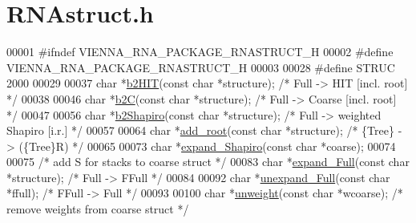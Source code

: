 \hypertarget{RNAstruct_8h_source}{}\section{R\+N\+Astruct.\+h}
\label{RNAstruct_8h_source}

\begin{DoxyCode}
00001 \textcolor{preprocessor}{#ifndef VIENNA\_RNA\_PACKAGE\_RNASTRUCT\_H}
00002 \textcolor{preprocessor}{#define VIENNA\_RNA\_PACKAGE\_RNASTRUCT\_H}
00003 
00028 \textcolor{preprocessor}{#define STRUC     2000}
00029 
00037 \textcolor{keywordtype}{char} *\hyperlink{group__struct__utils_ga07b7e90e712559a1992fba3ac6d21bbd}{b2HIT}(\textcolor{keyword}{const} \textcolor{keywordtype}{char} *structure);             \textcolor{comment}{/* Full   -> HIT    [incl. root] */}
00038 
00046 \textcolor{keywordtype}{char} *\hyperlink{group__struct__utils_ga9c80d92391f2833549a8b6dac92233f0}{b2C}(\textcolor{keyword}{const} \textcolor{keywordtype}{char} *structure);               \textcolor{comment}{/* Full   -> Coarse [incl. root] */}
00047 
00056 \textcolor{keywordtype}{char} *\hyperlink{group__struct__utils_ga5cd2feb367feeacad0c03cb7ddba5f10}{b2Shapiro}(\textcolor{keyword}{const} \textcolor{keywordtype}{char} *structure);         \textcolor{comment}{/* Full -> weighted Shapiro [i.r.] */}
00057 
00064 \textcolor{keywordtype}{char} *\hyperlink{group__struct__utils_ga880d33066dd95441e5fbb73c57ed1c3e}{add\_root}(\textcolor{keyword}{const} \textcolor{keywordtype}{char} *structure);                   \textcolor{comment}{/* \{Tree\} -> (\{Tree\}R)          */}
00065 
00073 \textcolor{keywordtype}{char}  *\hyperlink{group__struct__utils_gabe3d815b420dc4553bfb23511198b4c6}{expand\_Shapiro}(\textcolor{keyword}{const} \textcolor{keywordtype}{char} *coarse);
00074 
00075 \textcolor{comment}{/* add S for stacks to coarse struct */}
00083 \textcolor{keywordtype}{char}  *\hyperlink{group__struct__utils_ga78d73cd54a068ef2812812771cdddc6f}{expand\_Full}(\textcolor{keyword}{const} \textcolor{keywordtype}{char} *structure);      \textcolor{comment}{/* Full   -> FFull         */}
00084 
00092 \textcolor{keywordtype}{char}  *\hyperlink{group__struct__utils_ga260c4b622093b76a883bf96628280de1}{unexpand\_Full}(\textcolor{keyword}{const} \textcolor{keywordtype}{char} *ffull);        \textcolor{comment}{/* FFull  -> Full          */}
00093 
00100 \textcolor{keywordtype}{char}  *\hyperlink{group__struct__utils_ga09a80253ac7b6bae606871ba7c6e5136}{unweight}(\textcolor{keyword}{const} \textcolor{keywordtype}{char} *wcoarse);           \textcolor{comment}{/* remove weights from coarse struct */}

\end{DoxyCode}
